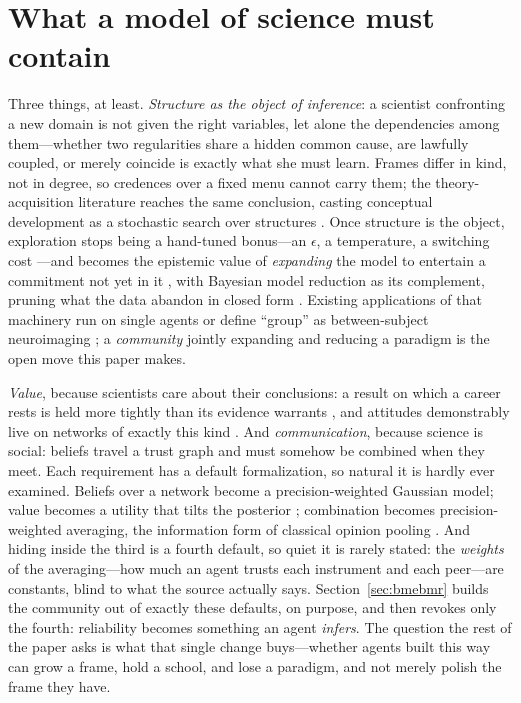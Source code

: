 \documentclass[runningheads]{llncs}
\begin{document}
\section{What a model of science must contain}
\label{sec:hidden}

Three things, at least. \emph{Structure as the object of inference}: a scientist confronting a
new domain is not given the right variables, let alone the dependencies among them---whether two
regularities share a hidden common cause, are lawfully coupled, or merely coincide is exactly
what she must learn. Frames differ in kind, not in degree, so credences over a fixed menu cannot
carry them; the theory-acquisition literature reaches the same conclusion, casting conceptual
development as a stochastic search over structures \citep{ullman2020,kemp2008form,ullman2012}.
Once structure is the object, exploration stops being a hand-tuned bonus---an $\epsilon$, a
temperature, a switching cost \citep{zollman2010,oconnor2019}---and becomes the epistemic value
of \emph{expanding} the model to entertain a commitment not yet in it
\citep{friston2015,friston2017curiosity}, with Bayesian model reduction as its complement,
pruning what the data abandon in closed form \citep{friston2018bmr,neacsu2022}. Existing
applications of that machinery run on single agents \citep{neacsu2022,priorelli2023} or define
``group'' as between-subject neuroimaging \citep{friston2016peb}; a \emph{community} jointly
expanding and reducing a paradigm is the open move this paper makes.

\emph{Value}, because scientists care about their conclusions: a result on which a career rests
is held more tightly than its evidence warrants \citep{kitcher1990,strevens2003}, and attitudes
demonstrably live on networks of exactly this kind \citep{dalege2016}. And \emph{communication},
because science is social: beliefs travel a trust graph and must somehow be combined when they
meet. Each requirement has a default formalization, so natural it is hardly ever examined.
Beliefs over a network become a precision-weighted Gaussian model; value becomes a utility that
tilts the posterior \citep{hyland2025}; combination becomes precision-weighted averaging, the
information form of classical opinion pooling \citep{degroot1974,genest1986}. And hiding inside
the third is a fourth default, so quiet it is rarely stated: the \emph{weights} of the
averaging---how much an agent trusts each instrument and each peer---are constants, blind to what
the source actually says. Section~\ref{sec:bmebmr} builds the community out of exactly these
defaults, on purpose, and then revokes only the fourth: reliability becomes something an agent
\emph{infers}. The question the rest of the paper asks is what that single change buys---whether
agents built this way can grow a frame, hold a school, and lose a paradigm, and not merely polish
the frame they have.
\end{document}
